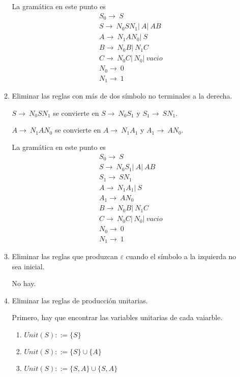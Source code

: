\documentclass{article}
\begin{document}
\begin{enumerate}
\begin{enumerate}
        La gramática en este punto es
        \begin{align*}
            &S_0 \rightarrow \ S \\
            &S \rightarrow \ N_0SN_1 |\ A |\ AB \\
            &A \rightarrow \ N_1AN_0 |\ S \\
            &B \rightarrow \ N_0B |\ N_1C \\
            &C \rightarrow \ N_0C |\ N_0 |\ vacio \\
            &N_0 \rightarrow \ 0 \\
            &N_1 \rightarrow \ 1
        \end{align*}

        \item Eliminar las reglas con más de dos símbolo no terminales a la derecha.
        
        $S \rightarrow \ N_0SN_1$ se convierte en $S \rightarrow \ N_0S_1$ y 
        $S_1 \rightarrow \ SN_1$.

        $A \rightarrow \ N_1AN_0$ se convierte en $A \rightarrow \ N_1A_1$ y 
        $A_1 \rightarrow \ AN_0$.

        La gramática en este punto es
        \begin{align*}
            &S_0 \rightarrow \ S \\
            &S \rightarrow \ N_0S_1 |\ A |\ AB \\
            &S_1 \rightarrow \ SN_1 \\
            &A \rightarrow \ N_1A_1 |\ S \\
            &A_1 \rightarrow \ AN_0 \\
            &B \rightarrow \ N_0B |\ N_1C \\
            &C \rightarrow \ N_0C |\ N_0 |\ vacio \\
            &N_0 \rightarrow \ 0 \\
            &N_1 \rightarrow \ 1
        \end{align*}

        \item Eliminar las reglas que produzcan $\varepsilon$ cuando el símbolo
        a la izquierda no sea inicial.

        No hay.

        \item Eliminar las reglas de producción unitarias.
        
        Primero, hay que encontrar las variables unitarias de cada vaiarble.
        \begin{enumerate}
            \item $Unit(S) ::= \{S\}$
            \item $Unit(S) ::= \{S\} \cup \{A\}$
            \item $Unit(S) ::= \{S, A\} \cup \{S, A\}$
        \end{enumerate}


\end{enumerate}
\end{enumerate}
\end{document}
